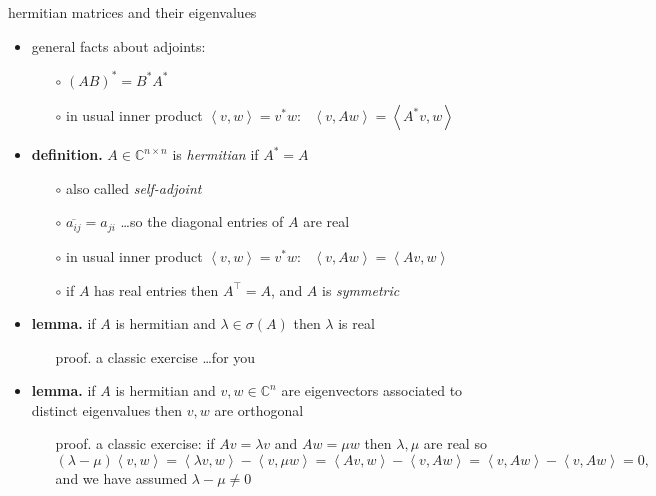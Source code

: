 \documentclass[10pt,hyperref]{beamer}
\newcommand{\CC}{\mathbb{C}}
\newcommand{\ip}[2]{\left<#1,#2\right>}
\begin{document}
\begin{frame}{hermitian matrices and their eigenvalues}

\begin{itemize}
\item general facts about adjoints:
    \begin{itemize}
    \item[$\circ$] $(AB)^*=B^*A^*$
    \item[$\circ$] in usual inner product $\ip{v}{w}=v^*w$: \, $\ip{v}{Aw} = \ip{A^* v}{w}$
    \end{itemize}
\item \textbf{definition.} $A \in \CC^{n\times n}$ is \emph{hermitian} if $A^*=A$
    \begin{itemize}
    \item[$\circ$] also called \emph{self-adjoint}
    \item[$\circ$] $\overline{a_{ij}} = a_{ji}$ \dots so the diagonal entries of $A$ are real
    \item[$\circ$] in usual inner product $\ip{v}{w}=v^*w$: \, $\ip{v}{Aw} = \ip{A v}{w}$
    \item[$\circ$] if $A$ has real entries then $A^\top=A$, and $A$ is \emph{symmetric}
    \end{itemize}
\item \textbf{lemma.} if $A$ is hermitian and $\lambda \in \sigma(A)$ then $\lambda$ is real
    \begin{itemize}
    \item[proof.] a classic exercise \dots for you
    \end{itemize}
\item \textbf{lemma.} if $A$ is hermitian and $v,w \in \CC^n$ are eigenvectors associated to distinct eigenvalues then $v,w$ are orthogonal
    \begin{itemize}
    \item[proof.] a classic exercise: if $Av=\lambda v$ and $Aw=\mu w$ then $\lambda,\mu$ are real so
    $$(\lambda-\mu) \ip{v}{w} = \ip{\lambda v}{w} - \ip{v}{\mu w} = \ip{Av}{w} - \ip{v}{Aw} = \ip{v}{Aw} - \ip{v}{Aw} = 0,$$
and we have assumed $\lambda-\mu \ne 0$
    \end{itemize}
\end{itemize}
\end{frame}
\end{document}
